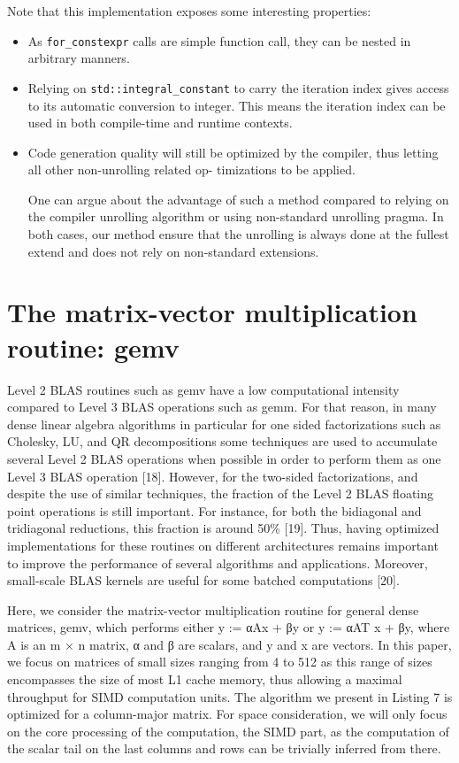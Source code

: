 \documentclass[../../main.tex]{subfiles}
\begin{document}
Note that this implementation exposes some interesting
properties:

\begin{itemize}
\item As \lstinline{for_constexpr} calls are simple function call, they
can be nested in arbitrary manners.

\item Relying on \lstinline{std::integral_constant} to carry the
iteration index gives access to its automatic conversion
to integer. This means the iteration index can be used in
both compile-time and runtime contexts.

\item Code generation quality will still be optimized by the
compiler, thus letting all other non-unrolling related op-
timizations to be applied.

One can argue about the advantage of such a method
compared to relying on the compiler unrolling algorithm
or using non-standard unrolling pragma. In both cases, our
method ensure that the unrolling is always done at the fullest
extend and does not rely on non-standard extensions.
\end{itemize}

\section{The matrix-vector multiplication routine: gemv}

Level 2 BLAS routines such as gemv have a low
computational intensity compared to Level 3 BLAS operations
such as gemm. For that reason, in many dense linear algebra
algorithms in particular for one sided factorizations such as
Cholesky, LU, and QR decompositions some techniques are
used to accumulate several Level 2 BLAS operations when
possible in order to perform them as one Level 3 BLAS
operation [18]. However, for the two-sided factorizations,
and despite the use of similar techniques, the fraction of the
Level 2 BLAS floating point operations is still important. For
instance, for both the bidiagonal and tridiagonal reductions,
this fraction is around 50\% [19]. Thus, having optimized
implementations for these routines on different architectures
remains important to improve the performance of several
algorithms and applications. Moreover, small-scale BLAS
kernels are useful for some batched computations [20].

Here, we consider the matrix-vector multiplication routine
for general dense matrices, gemv, which performs either
y := αAx + βy or y := αAT x + βy, where A is an m × n
matrix, α and β are scalars, and y and x are vectors. In
this paper, we focus on matrices of small sizes ranging from
4 to 512 as this range of sizes encompasses the size of
most L1 cache memory, thus allowing a maximal throughput
for SIMD computation units. The algorithm we present in
Listing 7 is optimized for a column-major matrix. For space
consideration, we will only focus on the core processing of
the computation, \ie the SIMD part, as the computation of
the scalar tail on the last columns and rows can be trivially
inferred from there.
\end{document}
